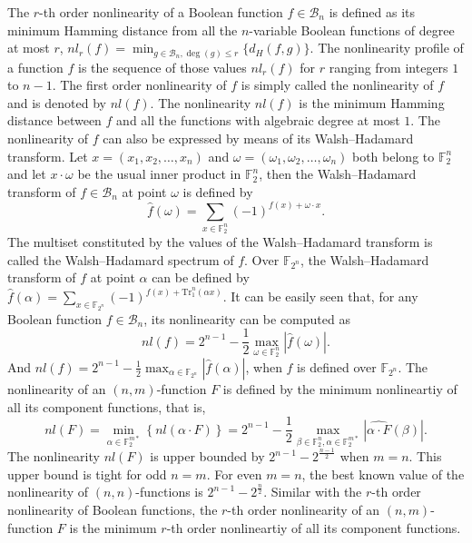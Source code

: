 \documentclass[12 pt]{article}
\def\F{{\mathbb F}}
\begin{document}
  The $r$-th order nonlinearity of a Boolean function $f\in\mathcal{B}_n$ is defined as its minimum Hamming distance from all the $n$-variable Boolean functions of degree at most $r$, $nl_r(f)=\min_{g\in\mathcal{B}_n,\deg(g)\le r}\{d_H(f,g)\}$. 
  The nonlinearity profile of a function $f$ is the sequence of those values $nl_r(f)$ for $r$ ranging from integers $1$ to $n-1$. The first order nonlinearity of $f$ is simply called the nonlinearity of $f$ and is denoted by $nl(f)$. 
  The nonlinearity $nl(f)$ is the minimum Hamming distance between $f$ and all the functions with algebraic degree at most $1$.
  The nonlinearity of $f$ can also be expressed by means of its Walsh--Hadamard transform. 
  Let $x=(x_1,x_2,\ldots,x_n)$ and $\omega=(\omega_1,\omega_2,\ldots,\omega_n)$ both belong to $\F_2^n$ and let $x\cdot\omega$ be the usual inner product in $\F_2^n$, then the Walsh--Hadamard transform of $f\in\mathcal{B}_n$ at point $\omega$ is defined by
  \begin{equation*}
    \widehat{f}(\omega)=\sum_{x\in\F_2^n}(-1)^{f(x)+\omega\cdot x}.
  \end{equation*}
  The multiset constituted by the values of the Walsh--Hadamard transform is called the Walsh--Hadamard spectrum of $f$. 
  Over $\F_{2^n}$, the Walsh--Hadamard transform of $f$ at point $\alpha$ can be defined by $\widehat{f}(\alpha)=\sum_{x\in\mathbb F_{2^n}}(-1)^{f(x)+\mathrm{Tr}_1^n(\alpha x)}$. 
  It can be easily seen that, for any Boolean function $f\in\mathcal{B}_n$, its nonlinearity can be computed as 
  \begin{equation*}\label{N_f}
    nl(f)= 2^{n-1}-\frac{1}{2}\max_{\omega\in\F_2^n}\left\lvert \widehat{f}(\omega) \right\rvert. 
  \end{equation*}
  And $nl(f)= 2^{n-1}-\frac{1}{2}\max_{\alpha\in\F_{2^n}}\left\lvert \widehat{f}(\alpha) \right\rvert$, when $f$ is defined over $\F_{2^n}$. 
  The nonlinearity of an $(n,m)$-function $F$ is defined by the minimum nonlineartiy of all its component functions, that is,
  \begin{equation*}
    nl(F)=\min_{\alpha\in\F_2^{m*}}\left\{ nl(\alpha\cdot F) \right\}=2^{n-1}-\frac{1}{2}\max_{\beta\in\F_2^n,\alpha\in\F_2^{m*}} \left\lvert \widehat{\alpha\cdot F}(\beta) \right\rvert.
  \end{equation*}
  The nonlinearity $nl(F)$ is upper bounded by $2^{n-1}-2^{\frac{n-1}{2}}$ when $m=n$. 
  This upper bound is tight for odd $n=m$. 
  For even $m=n$, the best known value of the nonlinearity of $(n,n)$-functions is $2^{n-1}-2^{\frac{n}{2}}$. 
  Similar with the $r$-th order nonlinearity of Boolean functions, the $r$-th order nonlinearity of an $(n,m)$-function $F$ is the minimum $r$-th order nonlineartiy of all its component functions. 
\end{document}
